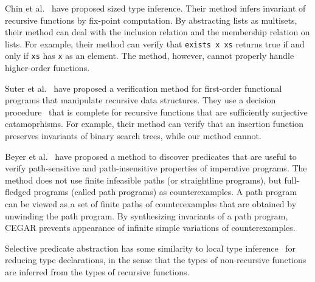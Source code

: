 Chin et al.~\cite{Chin2003} have proposed sized type inference.  Their
method infers invariant of recursive functions by fix-point computation.
By abstracting lists as multisets, their method can deal with the
inclusion relation and the membership relation on lists.  For example, their method
can verify that \texttt{exists x xs} returns true if and only if
\texttt{xs} has \texttt{x} as an element.  The method, however, cannot
properly handle higher-order functions.

Suter et al.~\cite{Suter2011} have proposed a verification method for first-order
functional programs that manipulate recursive data
structures.  They use a decision
procedure~\cite{Suter2010} that is complete for recursive functions that
are sufficiently surjective catamoprhisms.  For example, their method
can verify that an insertion function preserves invariants of binary
search trees, while our method cannot.

Beyer et al.~\cite{Beyer2007} have proposed a method to discover
predicates that are useful to verify path-sensitive and path-insensitive
properties of imperative programs.  The method does not use finite
infeasible paths (or straightline programs), but full-fledged programs
(called path programs) as counterexamples.  A path program can be viewed
as a set of finite paths of counterexamples that are obtained by
unwinding the path program.  By synthesizing invariants of a path
program, CEGAR prevents appearance of infinite simple variations of
counterexamples.

Selective predicate abstraction has some similarity to local type
inference~\cite{Pierce2000} for reducing type declarations, in the sense
that the types of non-recursive functions are inferred from the types of
recursive functions.
